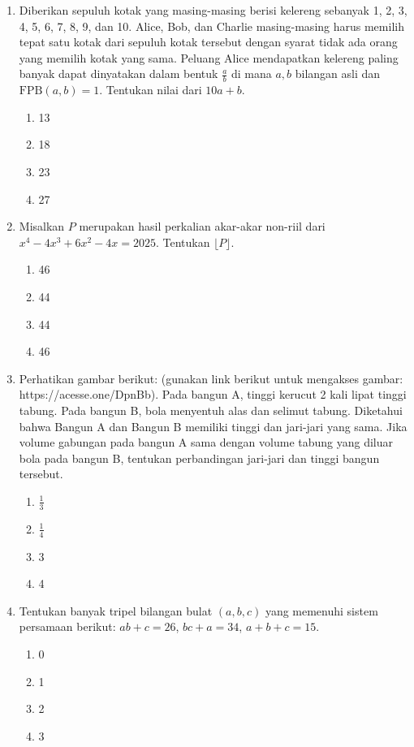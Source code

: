 \documentclass[12pt]{article}
\begin{document}
\begin{enumerate}
    \item Diberikan sepuluh kotak yang masing-masing berisi kelereng sebanyak 1, 2, 3, 4, 5, 6, 7, 8, 9, dan 10. Alice, Bob, dan Charlie masing-masing harus memilih tepat satu kotak dari sepuluh kotak tersebut dengan syarat tidak ada orang yang memilih kotak yang sama. Peluang Alice mendapatkan kelereng paling banyak dapat dinyatakan dalam bentuk $\frac{a}{b}$ di mana $a, b$ bilangan asli dan $\text{FPB}(a,b)=1$. Tentukan nilai dari $10a+b$.
    \begin{enumerate}
        \item 13
        \item 18
        \item 23
        \item 27
    \end{enumerate}

    \item Misalkan $P$ merupakan hasil perkalian akar-akar non-riil dari $x^{4}-4x^{3}+6x^{2}-4x=2025$. Tentukan $\lfloor P \rfloor$.
    \begin{enumerate}
        \item 46
        \item 44
        \item 44
        \item 46
    \end{enumerate}

    \item Perhatikan gambar berikut: (gunakan link berikut untuk mengakses gambar: https://acesse.one/DpnBb). Pada bangun A, tinggi kerucut 2 kali lipat tinggi tabung. Pada bangun B, bola menyentuh alas dan selimut tabung. Diketahui bahwa Bangun A dan Bangun B memiliki tinggi dan jari-jari yang sama. Jika volume gabungan pada bangun A sama dengan volume tabung yang diluar bola pada bangun B, tentukan perbandingan jari-jari dan tinggi bangun tersebut.
    \begin{enumerate}
        \item $\frac{1}{3}$
        \item $\frac{1}{4}$
        \item 3
        \item 4
    \end{enumerate}

    \item Tentukan banyak tripel bilangan bulat $(a, b, c)$ yang memenuhi sistem persamaan berikut: 
    $ab+c=26$, $bc+a=34$, $a+b+c=15$.
    \begin{enumerate}
        \item 0
        \item 1
        \item 2
        \item 3
    \end{enumerate}


\end{enumerate}
\end{document}
